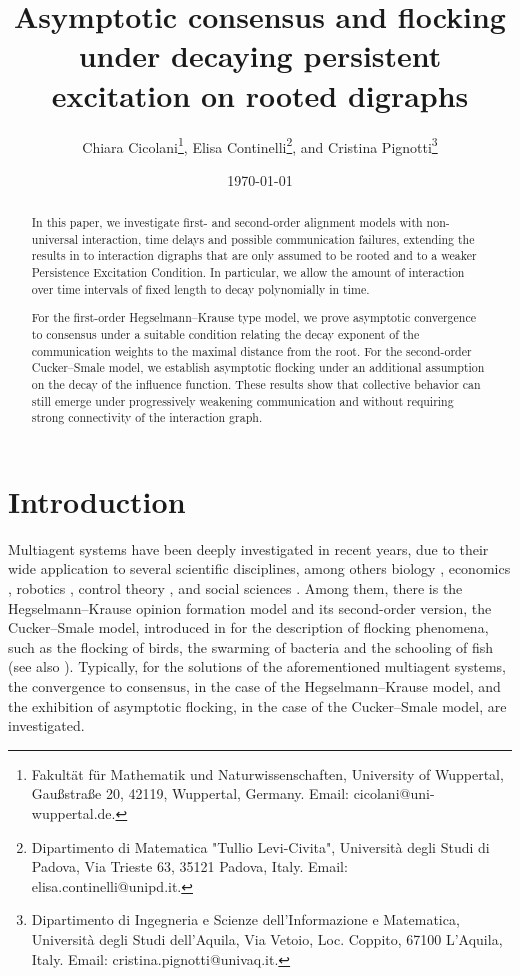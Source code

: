 \documentclass[11pt]{article}
\author{Chiara Cicolani\footnote{Fakultät für Mathematik und Naturwissenschaften, University of Wuppertal, Gaußstraße 20, 42119, Wuppertal, Germany. Email: cicolani@uni-wuppertal.de.}, Elisa Continelli\footnote{Dipartimento di Matematica "Tullio Levi-Civita", Università degli Studi di Padova, Via Trieste 63, 35121 Padova, Italy. Email: elisa.continelli@unipd.it.}, and Cristina Pignotti\footnote{Dipartimento di Ingegneria e Scienze dell'Informazione e Matematica, Università degli Studi dell'Aquila, Via Vetoio, Loc. Coppito, 67100 L'Aquila, Italy. Email: cristina.pignotti@univaq.it.}}
\title{Asymptotic consensus and flocking under decaying persistent excitation on rooted digraphs}
\date{\today}
\begin{document}
	\theoremstyle{plain} \newtheorem{thm}{Theorem}[section] \newtheorem{cor}[thm]{Corollary} \newtheorem{lem}[thm]{Lemma} \newtheorem{prop}[thm]{Proposition} \theoremstyle{definition} \newtheorem{defn}{Definition}[section] 
	
	\newtheorem{oss}[thm]{Remark}
	\newtheorem{ex}{Example}[section]
	\newtheorem{lemma}{Lemma}[section]

\maketitle
\begin{abstract}
In this paper, we investigate first- and second-order alignment models with non-universal interaction, time delays and possible communication failures, extending the results in \cite{CCP} to interaction digraphs that are only assumed to be rooted and to a weaker Persistence Excitation Condition. In particular, we allow the amount of interaction over time intervals of fixed length to decay polynomially in time.

For the first-order Hegselmann--Krause type model, we prove asymptotic convergence to consensus under a suitable condition relating the decay exponent of the communication weights to the maximal distance from the root. For the second-order Cucker--Smale model, we establish asymptotic flocking under an additional assumption on the decay of the influence function. These results show that collective behavior can still emerge under progressively weakening communication and without requiring strong connectivity of the interaction graph.
\end{abstract}
\section{Introduction}
\setcounter{equation}{0}


Multiagent systems have been deeply investigated in recent years, due to their
wide application to several scientific disciplines, among others biology
\cite{Cama}, economics \cite{Marsan}, robotics \cite{Bullo}, control
theory \cite{Borzi,PRT,WCB}, and social sciences
\cite{Bellomo, CF, Campi}. Among them, there is the
Hegselmann--Krause opinion formation model \cite{HK} and its second-order
version, the Cucker--Smale model, introduced in \cite{CS1} for the description
of flocking phenomena, such as the flocking of birds, the swarming of bacteria
and the schooling of fish (see also \cite{Ha1,Ha2}).  Typically, for the solutions of the
aforementioned multiagent systems, the convergence to consensus, in the case of
the Hegselmann--Krause model, and the exhibition of asymptotic flocking, in the
case of the Cucker--Smale model,  are investigated.
\end{document}
